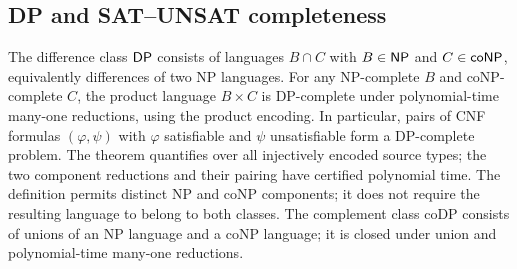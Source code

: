 \begin{result}
\subsection{DP and SAT--UNSAT completeness}
The difference class $\mathsf{DP}$ consists of languages $B\cap C$ with
$B\in\mathsf{NP}$ and $C\in\mathsf{coNP}$, equivalently differences of two NP
languages. For any NP-complete $B$ and coNP-complete $C$, the product language
$B\times C$ is DP-complete under polynomial-time many-one reductions, using
the product encoding. In particular, pairs of CNF formulas $(\varphi,\psi)$
with $\varphi$ satisfiable and $\psi$ unsatisfiable form a DP-complete problem.
The theorem quantifies over all injectively encoded source types; the two
component reductions and their pairing have certified polynomial time.
The definition permits distinct NP and coNP components; it does not require
the resulting language to belong to both classes.\citep{Papadimitriou94}
The complement class coDP consists of unions of an NP language and a coNP
language; it is closed under union and polynomial-time many-one reductions.
\end{result}


